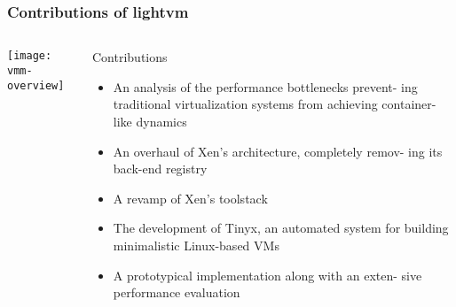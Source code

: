 \begin{frame}[plain]
	\frametitle{Contributions of lightvm}
	
	
	
	\begin{columns}
		
		\begin{column}{.4\textwidth}
			
			\texttt{[image: vmm-overview]}
			
		\end{column}
		
		\begin{column}{.6\textwidth}
			
			Contributions	
			\begin{itemize}
				\item An analysis of the performance bottlenecks prevent-
				ing traditional virtualization systems from achieving
				container-like dynamics 
				\item An overhaul of Xen’s architecture, completely remov-
				ing its back-end registry 
				\item A revamp of Xen’s toolstack
				\item The development of Tinyx, an automated system for
				building minimalistic Linux-based VMs
				\item A prototypical implementation along with an exten-
				sive performance evaluation 
			\end{itemize}	


		\end{column}
		
		
	\end{columns}
	
	
\end{frame}



